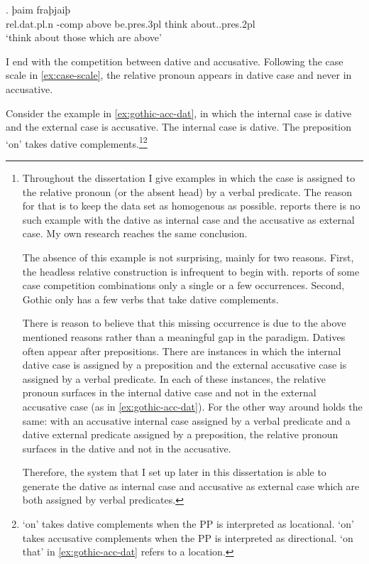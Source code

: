 \exg. þaim    fraþjaiþ \\
 \ac{rel}.\ac{dat}.\ac{pl}.\ac{n} -\ac{comp} above be.\ac{pres}.3\ac{pl}\scsub{[nom]} {think about}..\ac{pres}.2\ac{pl}\scsub{[dat]}\\
 `think about those which are above' \label{ex:gothic-nom-dat}

I end with the competition between dative and accusative. Following the case scale in \ref{ex:case-scale}, the relative pronoun appears in dative case and never in accusative.

Consider the example in \ref{ex:gothic-acc-dat}, in which the internal case is dative and the external case is accusative.
The internal case is dative. The preposition  `on' takes dative complements.\footnote{
Throughout the dissertation I give examples in which the case is assigned to the relative pronoun (or the absent head) by a verbal predicate. The reason for that is to keep the data set as homogenous as possible. \citet{harbert1978} reports there is no such example with the dative as internal case and the accusative as external case. My own research reaches the same conclusion.

The absence of this example is not surprising, mainly for two reasons. First, the headless relative construction is infrequent to begin with. \citeauthor{harbert1978} reports of some case competition combinations only a single or a few occurrences.
Second, Gothic only has a few verbs that take dative complements.

There is reason to believe that this missing occurrence is due to the above mentioned reasons rather than a meaningful gap in the paradigm. Datives often appear after prepositions. There are instances in which the internal dative case is assigned by a preposition and the external accusative case is assigned by a verbal predicate. In each of these instances, the relative pronoun surfaces in the internal dative case and not in the external accusative case (as in \ref{ex:gothic-acc-dat}). For the other way around holds the same: with an accusative internal case assigned by a verbal predicate and a dative external predicate assigned by a preposition, the relative pronoun surfaces in the dative and not in the accusative.

Therefore, the system that I set up later in this dissertation is able to generate the dative as internal case and accusative as external case which are both assigned by verbal predicates.
}\footnote{
 `on' takes dative complements when the PP is interpreted as locational.  `on' takes accusative complements when the PP is interpreted as directional.  `on that' in \ref{ex:gothic-acc-dat} refers to a location.
}
